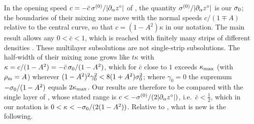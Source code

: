 In the opening speed $c=-\bar c\,\sigma^{(0)}/|\partial_\alpha z^\circ|$ of \cite{LM26}, the quantity $\sigma^{(0)}/|\partial_\alpha z^\circ|$ is our $\sigma_0$; the boundaries of their mixing zone move with
the normal speeds $c/(1\mp A)$ relative to the central curve, so that $c=(1-A^2)\kappa$ in our notation. The main result \cite[Thm.~1.1]{LM26} allows any $0<\bar c<1$, which is reached with finitely many
strips of different densities \cite[Sec.~7.5]{LM26}. These multilayer subsolutions are not single-strip subsolutions. The half-width of their mixing zone grows like $t\kappa$ with
$\kappa=c/(1-A^2)=-\bar c\,\sigma_0/(1-A^2)$, which for $\bar c$ close to $1$ exceeds $\kappa_{\max}$ (with $\rho_{\mathrm m}=A$) wherever $(1-A^2)^2\gamma_0^2<8(1+A^2)\sigma_0^2$; where $\gamma_0=0$ the supremum
$-\sigma_0/(1-A^2)$ equals $2\kappa_{\max}$. Our results are therefore to be compared with the single layer of \cite{LM26}, whose stated range is $c<-\sigma^{(0)}/(2|\partial_\alpha z^\circ|)$, i.e.\ $\bar c<\frac12$,
which in our notation is $0<\kappa<-\sigma_0/(2(1-A^2))$. Relative to \cite{LM26}, what is new is the following.
